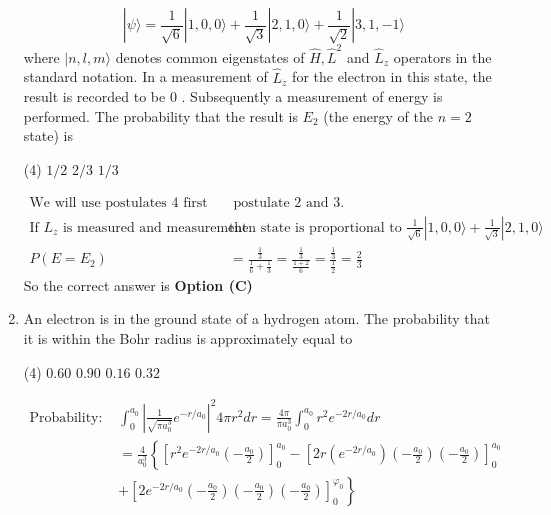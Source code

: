 \begin{enumerate}
	$$
	|\psi\rangle=\frac{1}{\sqrt{6}}|1,0,0\rangle+\frac{1}{\sqrt{3}}|2,1,0\rangle+\frac{1}{\sqrt{2}}|3,1,-1\rangle
	$$
	where $|n, l, m\rangle$ denotes common eigenstates of $\hat{H}, \hat{L}^{2}$ and $\hat{L}_{z}$ operators in the standard notation. In a measurement of $\hat{L}_{z}$ for the electron in this state, the result is recorded to be 0 . Subsequently a measurement of energy is performed. The probability that the result is $E_{2}$ (the energy of the $n=2$ state) is
{	}
\begin{tasks}(4)
\task[\textbf{B.}] $1 / 2$
\task[\textbf{C.}] $2 / 3$
\task[\textbf{D.}]  $1 / 3$
\end{tasks}
\begin{answer}
	$$
\begin{aligned}
\text{We will use postulates 4 first then use}&\text{ postulate 2 and 3.}\\
\text{If $L_{z}$ is measured and measurement is 0 }&\text{then state is proportional to $\frac{1}{\sqrt{6}}|1,0,0\rangle+\frac{1}{\sqrt{3}}|2,1,0\rangle$}\\
P\left(E=E_{2}\right)&=\frac{\frac{1}{3}}{\frac{1}{6}+\frac{1}{3}}=\frac{\frac{1}{3}}{\frac{1+2}{6}}=\frac{\frac{1}{3}}{\frac{1}{2}}=\frac{2}{3}
\end{aligned}
$$
So the correct answer is \textbf{Option (C)}
\end{answer}
\item 	An electron is in the ground state of a hydrogen atom. The probability that it is within the Bohr radius is approximately equal to
{}
\begin{tasks}(4)
\task[\textbf{A.}] $0.60$
\task[\textbf{B.}] $0.90$
\task[\textbf{C.}]  $0.16$
\task[\textbf{D.}] $0.32$
\end{tasks}
\begin{answer}
	$$
\begin{aligned}
\text{Probability: }&\int_{0}^{a_{0}}\left|\frac{1}{\sqrt{\pi a_{0}^{3}}} e^{-r / a_{0}}\right|^{2} 4 \pi r^{2} d r=\frac{4 \pi}{\pi a_{0}^{3}} \int_{0}^{a_{0}} r^{2} e^{-2 r / a_{0}} d r\\
&=\frac{4}{a_{0}^{3}}\left\{\left[r^{2} e^{-2 r / a_{0}}\left(-\frac{a_{0}}{2}\right)\right]_{0}^{a_{0}}-\left[2 r\left(e^{-2 r / a_{0}}\right)\left(-\frac{a_{0}}{2}\right)\left(-\frac{a_{0}}{2}\right)\right]_{0}^{a_{0}}\right. \\&\left. +\left[2 e^{-2 r / a_{0}}\left(-\frac{a_{0}}{2}\right)\left(-\frac{a_{0}}{2}\right)\left(-\frac{a_{0}}{2}\right)\right]_{0}^{\varphi_{0}}\right\}\\

\end{aligned}$$
\end{answer}
\end{enumerate}
